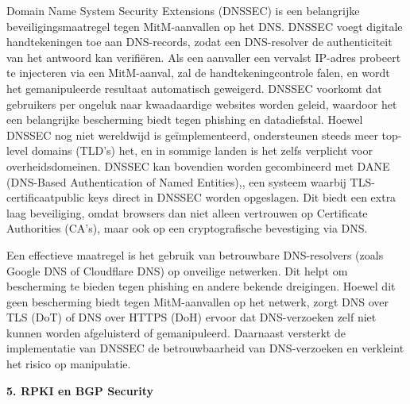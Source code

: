 Domain Name System Security Extensions (DNSSEC) is een belangrijke beveiligingsmaatregel tegen MitM-aanvallen op het DNS. DNSSEC voegt digitale handtekeningen toe aan DNS-records, zodat een DNS-resolver de authenticiteit van het antwoord kan verifiëren. Als een aanvaller een vervalst IP-adres probeert te injecteren via een MitM-aanval, zal de handtekeningcontrole falen, en wordt het gemanipuleerde resultaat automatisch geweigerd\autocite{Tehrani2024}.
DNSSEC voorkomt dat gebruikers per ongeluk naar kwaadaardige websites worden geleid, waardoor het een belangrijke bescherming biedt tegen phishing en datadiefstal. Hoewel DNSSEC nog niet wereldwijd is geïmplementeerd, ondersteunen steeds meer top-level domains (TLD's) het, en in sommige landen is het zelfs verplicht voor overheidsdomeinen.
DNSSEC kan bovendien worden gecombineerd met DANE (DNS-Based Authentication of Named Entities),, een systeem waarbij TLS-certificaatpublic keys direct in DNSSEC worden opgeslagen. Dit biedt een extra laag beveiliging, omdat browsers dan niet alleen vertrouwen op Certificate Authorities (CA’s), maar ook op een cryptografische bevestiging via DNS\autocite{Tehrani2024}.

Een effectieve maatregel is het gebruik van betrouwbare DNS-resolvers (zoals Google DNS of Cloudflare DNS) op onveilige netwerken. Dit helpt om bescherming te bieden tegen phishing en andere bekende dreigingen. Hoewel dit geen bescherming biedt tegen MitM-aanvallen op het netwerk, zorgt DNS over TLS (DoT) of DNS over HTTPS (DoH) ervoor dat DNS-verzoeken zelf niet kunnen worden afgeluisterd of gemanipuleerd. Daarnaast versterkt de implementatie van DNSSEC de betrouwbaarheid van DNS-verzoeken en verkleint het risico op manipulatie\autocite{cloudflare}.


\vspace{0.5cm}
\textbf{5. RPKI en BGP Security}
\vspace{0.5cm}

